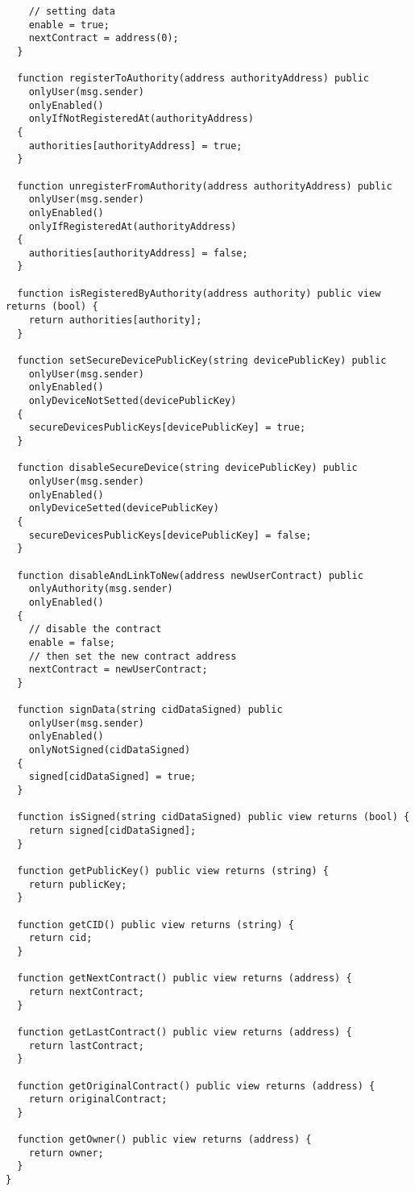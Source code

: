 \begin{lstlisting}
    // setting data
    enable = true;
    nextContract = address(0);
  }

  function registerToAuthority(address authorityAddress) public
    onlyUser(msg.sender)
    onlyEnabled()
    onlyIfNotRegisteredAt(authorityAddress)
  {
    authorities[authorityAddress] = true;
  }

  function unregisterFromAuthority(address authorityAddress) public
    onlyUser(msg.sender)
    onlyEnabled()
    onlyIfRegisteredAt(authorityAddress)
  {
    authorities[authorityAddress] = false;
  }

  function isRegisteredByAuthority(address authority) public view returns (bool) {
    return authorities[authority];
  }

  function setSecureDevicePublicKey(string devicePublicKey) public 
    onlyUser(msg.sender)
    onlyEnabled()
    onlyDeviceNotSetted(devicePublicKey)
  {
    secureDevicesPublicKeys[devicePublicKey] = true;
  }

  function disableSecureDevice(string devicePublicKey) public 
    onlyUser(msg.sender)
    onlyEnabled()
    onlyDeviceSetted(devicePublicKey)
  {
    secureDevicesPublicKeys[devicePublicKey] = false;
  }

  function disableAndLinkToNew(address newUserContract) public 
    onlyAuthority(msg.sender)
    onlyEnabled()
  {
    // disable the contract
    enable = false;
    // then set the new contract address
    nextContract = newUserContract;
  }

  function signData(string cidDataSigned) public
    onlyUser(msg.sender)
    onlyEnabled()
    onlyNotSigned(cidDataSigned)
  {
    signed[cidDataSigned] = true;
  }

  function isSigned(string cidDataSigned) public view returns (bool) {
    return signed[cidDataSigned];
  }

  function getPublicKey() public view returns (string) {
    return publicKey;
  }

  function getCID() public view returns (string) {
    return cid;
  }

  function getNextContract() public view returns (address) {
    return nextContract;
  }

  function getLastContract() public view returns (address) {
    return lastContract;
  }

  function getOriginalContract() public view returns (address) {
    return originalContract;
  }

  function getOwner() public view returns (address) {
    return owner;
  }
}
\end{lstlisting}